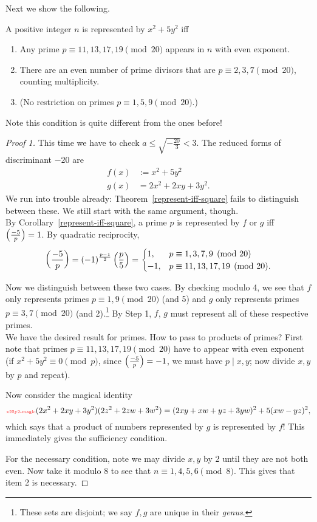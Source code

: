 Next we show the following.
\begin{ex}
A positive integer $n$ is represented by $x^2+5y^2$ iff
\begin{enumerate}
\item Any prime $p\equiv 11, 13, 17, 19\pmod{20}$ appears in $n$ with even exponent.
\item There are an even number of prime divisors that are $p\equiv 2,3,7\pmod{20}$, counting multiplicity.
\item (No restriction on primes $p\equiv 1, 5,9\pmod{20}$.)
\end{enumerate}
\end{ex}
Note this condition is quite different from the ones before!
\begin{proof}[Proof 1]
This time we have to check $a\le \sqrt{-\frac{20}{3}}<3$. The reduced forms of discriminant $-20$ are
\begin{align*}
f(x)&:=x^2+5y^2\\
g(x)&=2x^2+2xy+3y^2.
\end{align*}
We run into trouble already: Theorem~\ref{represent-iff-square} fails to distinguish between these. We still start with the same argument, though.\\

 By Corollary~\ref{represent-iff-square}, a prime $p$ is represented by $f$ or $g$ iff $\left( {\frac{-5}{p}} \right)=1$. By quadratic reciprocity,
\[
\left( {\frac{-5}{p}} \right)=(-1)^{\frac{p-1}2}\left( {\frac{p}{5}} \right)=\begin{cases}
1,&p\equiv 1,3,7,9\pmod{20}\\
-1,&p\equiv 11, 13, 17,19\pmod{20}.
\end{cases}
\]

 Now we distinguish between these two cases. By checking modulo 4, we see that $f$ only represents primes $p\equiv 1,9\pmod{20}$ (and 5) and $g$ only represents primes $p\equiv 3,7\pmod{20}$ (and 2).\footnote{These sets are disjoint; we say $f,g$ are unique in their {\it genus}.} By Step 1, $f$, $g$ must represent all of these respective primes.\\ %

 We have the desired result for primes. How to pass to products of primes? First note that primes $p\equiv 11, 13, 17, 19\pmod{20}$ have to appear with even exponent (if $x^2+5y^2\equiv 0\pmod{p}$, since $\left( {\frac{-5}{p}} \right)=-1$, we must have $p\mid x,y$; now divide $x,y$ by $p$ and repeat).

Now consider the magical identity
\begin{equation}\llabel{x25y2-magic}
(2x^2+2xy+3y^2)(2z^2+2zw+3w^2)
=(2xy+xw+yz+3yw)^2+5(xw-yz)^2,
\end{equation}
which says that a product of numbers represented by $g$ is represented by $f$! This immediately gives the sufficiency condition.

For the necessary condition, note we may divide $x,y$ by 2 until they are not both even. 
Now take it modulo 8 to see that  $n\equiv 1,4,5,6\pmod 8$. This gives that item 2 is necessary.
\end{proof}
